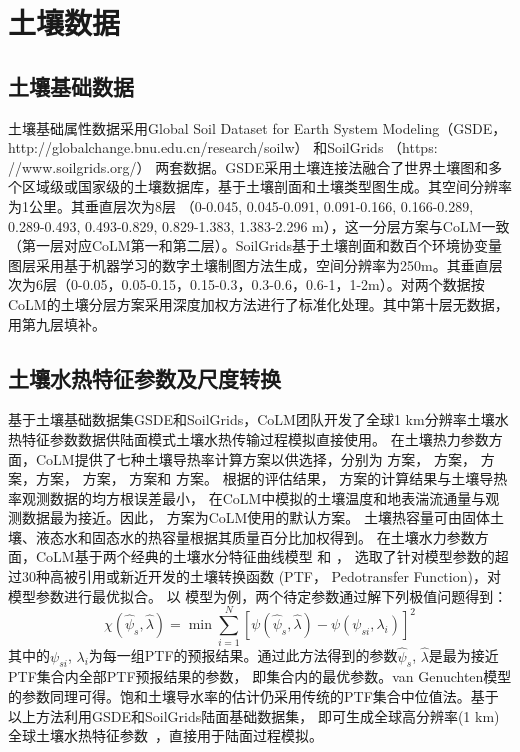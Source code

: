 \section{土壤数据}\label{土壤数据}
\subsection{土壤基础数据}\label{土壤基础数据}
土壤基础属性数据采用Global Soil Dataset for Earth System Modeling（GSDE，http://globalchange.bnu.edu.cn/research/soilw） \citep{shangguan2014global}
和SoilGrids （https:\\//www.soilgrids.org/）\citep{poggio2021soilgrids} 两套数据。GSDE采用土壤连接法融合了世界土壤图和多个区域级或国家级的土壤数据库，基于土壤剖面和土壤类型图生成。其空间分辨率为1公里。其垂直层次为8层 （0-0.045, 0.045-0.091, 0.091-0.166, 0.166-0.289, 0.289-0.493, 0.493-0.829, 0.829-1.383, 1.383-2.296 m），这一分层方案与CoLM一致（第一层对应CoLM第一和第二层）。SoilGrids基于土壤剖面和数百个环境协变量图层采用基于机器学习的数字土壤制图方法生成，空间分辨率为250m。其垂直层次为6层（0-0.05，0.05-0.15，0.15-0.3，0.3-0.6，0.6-1，1-2m）。对两个数据按CoLM的土壤分层方案采用深度加权方法进行了标准化处理。其中第十层无数据，用第九层填补。

\subsection{土壤水热特征参数及尺度转换}\label{土壤水热特征参数及尺度转换}

基于土壤基础数据集GSDE和SoilGrids，CoLM团队开发了全球1 km分辨率土壤水热特征参数数据供陆面模式土壤水热传输过程模拟直接使用。
在土壤热力参数方面，CoLM提供了七种土壤导热率计算方案以供选择，分别为 \citet{farouki1981thermal}方案，\citet{Johansen1975} 方案，
\citet{cote2005} 方案，\citet{balland2005}方案，\citet{lu2007improved} 方案，\citet{tarnawski2012series} 方案和 \citet{de1963thermal} 方案。
根据\citet{dai2019evaluation}的评估结果，\citet{balland2005} 方案的计算结果与土壤导热率观测数据的均方根误差最小，
在CoLM中模拟的土壤温度和地表湍流通量与观测数据最为接近。因此，\citet{balland2005} 方案为CoLM使用的默认方案。
土壤热容量可由固体土壤、液态水和固态水的热容量根据其质量百分比加权得到。
在土壤水力参数方面，CoLM基于两个经典的土壤水分特征曲线模型 \citet{campbell1974} 和 \citet{van1980closed}，
选取了针对模型参数的超过30种高被引用或新近开发的土壤转换函数 (PTF， Pedotransfer Function)，对模型参数进行最优拟合。
以\citet{balland2005,campbell1974} 模型为例，两个待定参数通过解下列极值问题得到：
\begin{equation}
\chi\left(\hat{\psi}_{s}, \hat{\lambda}\right)=\min \sum_{i=1}^{N}\left[\psi\left(\hat{\psi}_{s}, \hat{\lambda}\right)-\psi\left(\psi_{s i}, \lambda_{i}\right)\right]^{2}
\end{equation}
%
其中的$\psi_{s i}$, $\lambda_{i}$为每一组PTF的预报结果。通过此方法得到的参数$\hat{\psi}_{s}$, $\hat{\lambda}$是最为接近PTF集合内全部PTF预报结果的参数，
即集合内的最优参数。van Genuchten模型的参数同理可得。饱和土壤导水率的估计仍采用传统的PTF集合中位值法。基于以上方法利用GSDE和SoilGrids陆面基础数据集，
即可生成全球高分辨率(1 km)全球土壤水热特征参数~\citep{dai2019evaluation}，直接用于陆面过程模拟。


